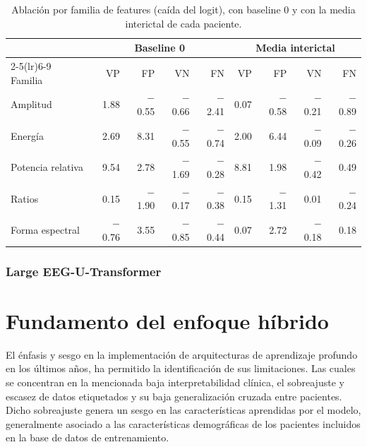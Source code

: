 \begin{table}[htbp]
\centering
\small
\caption{Ablación por familia de features (caída del logit), con baseline 0 y con la media interictal de cada paciente.}
\label{tab:familias}
\begin{tabular}{lrrrrrrrr}
\toprule
& \multicolumn{4}{c}{Baseline 0} & \multicolumn{4}{c}{Media interictal} \\
\cmidrule(lr){2-5}\cmidrule(lr){6-9}
Familia & VP & FP & VN & FN & VP & FP & VN & FN \\
\midrule
Amplitud & 1.88 & $-$0.55 & $-$0.66 & $-$2.41 & 0.07 & $-$0.58 & $-$0.21 & $-$0.89 \\
Energía & 2.69 & 8.31 & $-$0.55 & $-$0.74 & 2.00 & 6.44 & $-$0.09 & $-$0.26 \\
Potencia relativa & 9.54 & 2.78 & $-$1.69 & $-$0.28 & 8.81 & 1.98 & $-$0.42 & 0.49 \\
Ratios & 0.15 & $-$1.90 & $-$0.17 & $-$0.38 & 0.15 & $-$1.31 & 0.01 & $-$0.24 \\
Forma espectral & $-$0.76 & 3.55 & $-$0.85 & $-$0.44 & 0.07 & 2.72 & $-$0.18 & 0.18 \\
\bottomrule
\end{tabular}
\end{table}


\subsubsection{Large EEG-U-Transformer}

\section{Fundamento del enfoque híbrido}
El énfasis y sesgo en la implementación de arquitecturas de aprendizaje profundo en los últimos años, ha permitido la identificación de sus limitaciones. 
Las cuales se concentran en la mencionada baja interpretabilidad clínica, el sobreajuste y escasez de datos etiquetados y su baja generalización cruzada entre pacientes. 
Dicho sobreajuste genera un sesgo en las características aprendidas por el modelo, generalmente asociado a las características demográficas de los pacientes incluidos en la base de datos de entrenamiento. 

